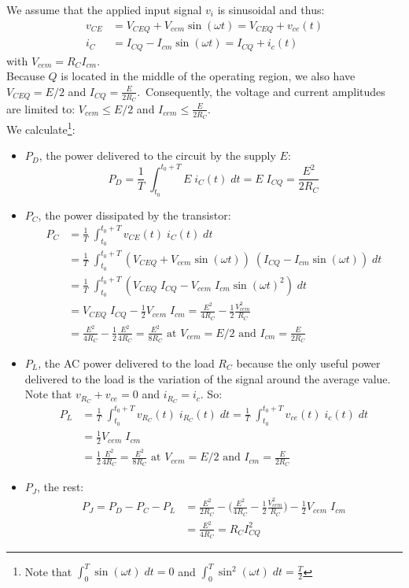 We assume that the applied input signal $v_i$ is sinusoidal and thus:
\begin{align*}
	v_{CE} &= V_{CEQ} +  V_{cem} \sin(\omega t) = V_{CEQ}  + v_{ce}(t) \\
	i_C &= I_{CQ} - I_{cm} \sin(\omega t) = I_{CQ} + i_{c} (t)
\end{align*}
with $V_{cem} = R_C I_{cm}$.\\
Because $Q$ is located in the middle of the operating region, we also have $V_{CEQ} = E/2$ and $I_{CQ} = \frac{E}{2R_C}$.\ Consequently, the voltage and current amplitudes are limited to: $V_{cem} \le E/2$ and $I_{cem }\le \frac{E}{2R_C}$.\\
We calculate\footnote{Note that $\int_{0}^{T} \sin(\omega t) \; dt = 0$ and $\int_{0}^{T} \sin^2(\omega t) \; dt = \frac{T}{2}$}:
\begin{itemize}
	\item $P_D$, the power delivered to the circuit by the supply $E$:
	$$
	P_D = \frac{1}{T}\;\int_{t_0}^{t_0 + T} E \; i_C(t) \; dt = E\;I_{CQ} = \frac{E^2}{2 R_C}
	$$
	\item $P_C$, the power dissipated by the transistor:
	\begin{align*}	
	P_C &= \frac{1}{T}\;\int_{t_0}^{t_0 + T} v_{CE}(t) \; i_C(t) \; dt \\
		&= \frac{1}{T}\;\int_{t_0}^{t_0 + T} (V_{CEQ} +  V_{cem} \sin(\omega t)) \; (I_{CQ} - I_{cm} \sin(\omega t)) \; dt \\
		&=  \frac{1}{T}\;\int_{t_0}^{t_0 + T} (V_{CEQ}\;I_{CQ} -  V_{cem} \; I_{cm}\sin(\omega t)^2)\; dt \\
		&= V_{CEQ}\;I_{CQ} - \frac{1}{2}V_{cem} \; I_{cm}  = \frac{E^2}{4R_C} -\frac{1}{2}\frac{V_{cem}^2}{R_C} \\
		&= \frac{E^2}{4R_C} - \frac{1}{2}\frac{E^2}{4R_C}  = \frac{E^2}{8R_C} \text{ at $V_{cem} = E/2$ and $I_{cm}= \frac{E}{2R_C}$}
	\end{align*}
	\item $P_L$, the AC power delivered to the load $R_C$ because the only useful power delivered to the load is the variation of the signal around the average value. Note that $v_{R_C} + v_{ce} = 0$ and $i_{R_C} = i_c$. So:
	\begin{align*}	
		P_L &= \frac{1}{T}\;\int_{t_0}^{t_0 + T} v_{R_C}(t) \; i_{R_C}(t) \; dt  = \frac{1}{T}\;\int_{t_0}^{t_0 + T} v_{ce}(t) \; i_c(t) \; dt \\
			&= \frac{1}{2}V_{cem} \; I_{cm} \\
			&=\frac{1}{2}\frac{E^2}{4R_C} =\frac{E^2}{8R_C} \text{ at $V_{cem} = E/2$ and $I_{cm} = \frac{E}{2R_C}$}
	\end{align*}
	\item $P_J$, the rest:
	\begin{align*}
		P_J = P_D - P_C - P_L &= \frac{E^2}{2 R_C} - \bigg(\frac{E^2}{4R_C} -\frac{1}{2}\frac{V_{cem}^2}{R_C}\bigg) - \frac{1}{2}V_{cem} \; I_{cm} \\
							  &= \frac{E^2}{4R_C} = R_C I_{CQ}^2
	\end{align*}
\end{itemize}
